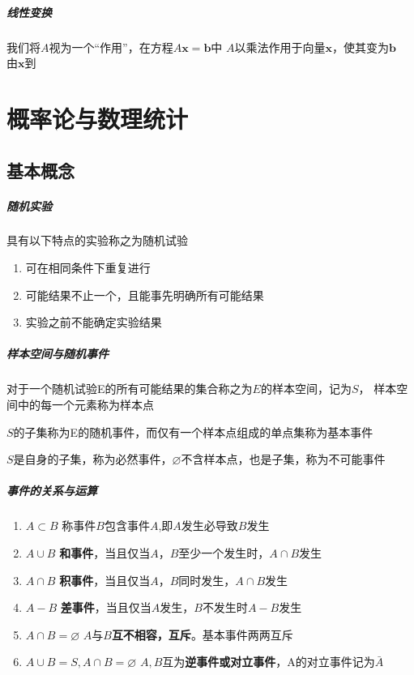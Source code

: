 \documentclass[12pt]{report}
\begin{document}
\paragraph{线性变换}
    我们将$A$视为一个“作用”，在方程$A\boldsymbol{x}=\boldsymbol{b}$中
    $A$以乘法作用于向量$\boldsymbol{x}$，使其变为$\boldsymbol{b}$\\
    由$\boldsymbol{x}$到
\chapter{概率论与数理统计}
\section{基本概念}
\paragraph{随机实验}
    具有以下特点的实验称之为随机试验
\begin{enumerate}
    \item 可在相同条件下重复进行
    \item 可能结果不止一个，且能事先明确所有可能结果
    \item 实验之前不能确定实验结果
\end{enumerate}
\paragraph{样本空间与随机事件}\quad \par
    对于一个随机试验E的所有可能结果的集合称之为$E$的样本空间，记为$S$，
    样本空间中的每一个元素称为样本点\par
    $S$的子集称为E的随机事件，而仅有一个样本点组成的单点集称为基本事件\par
    $S$是自身的子集，称为必然事件，$\varnothing$不含样本点，也是子集，称为不可能事件\par
\paragraph{事件的关系与运算}
    \begin{enumerate}
        \item $A\subset B$ \quad 称事件$B$包含事件$A$,即$A$发生必导致$B$发生
        \item $A\cup B$ \quad \textbf{和事件}，当且仅当$A$，$B$至少一个发生时，$A\cap B$发生
        \item $A\cap B$ \quad \textbf{积事件}，当且仅当$A$，$B$同时发生，$A\cap B$发生
        \item $A-B$ \quad \textbf{差事件}，当且仅当$A$发生，$B$不发生时$A-B$发生
        \item $A\cap B=\varnothing$ \quad $A$与$B$\textbf{互不相容，互斥}。基本事件两两互斥
        \item $A\cup B=S, A\cap B=\varnothing$ \quad $A,B$互为\textbf{逆事件或对立事件}，A的对立事件记为$\bar{A}$
    \end{enumerate}
\newpage
\end{document}
